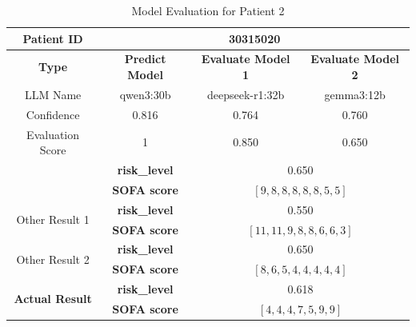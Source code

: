 \begin{table}[htbp]
 \centering
 \caption{Model Evaluation for Patient 2}
 \label{tab:patient2}
 \begin{tabular}{cccc}
 \toprule
 \textbf{ Patient ID } & \multicolumn{3}{c}{30315020} \\
 \midrule
 \textbf{ Type } & \textbf{ Predict Model } & \textbf{ Evaluate Model 1 } & \textbf{ Evaluate Model 2 } \\
 LLM Name & qwen3:30b & deepseek-r1:32b & gemma3:12b \\
 Confidence & 0.816 & 0.764 & 0.760 \\
 Evaluation Score & 1 & 0.850 & 0.650 \\
 \midrule
 \addlinespace
 \multirow{2}{*}{\textbf{ Best Result }} & \textbf{ risk\_level } & \multicolumn{2}{c}{0.650} \\
      & \textbf{ SOFA score } & \multicolumn{2}{c}{$[9, 8, 8, 8, 8, 8, 5, 5]$} \\
 \midrule
 \multirow{2}{*}{Other Result 1} & \textbf{ risk\_level } & \multicolumn{2}{c}{0.550} \\
      & \textbf{ SOFA score } & \multicolumn{2}{c}{$[11, 11, 9, 8, 8, 6, 6, 3]$} \\
 \midrule
 \multirow{2}{*}{Other Result 2} & \textbf{ risk\_level } & \multicolumn{2}{c}{0.650} \\
      & \textbf{ SOFA score } & \multicolumn{2}{c}{$[8, 6, 5, 4, 4, 4, 4, 4]$} \\
 \midrule
 \multirow{2}{*}{\textbf{ Actual Result }} & \textbf{ risk\_level } & \multicolumn{2}{c}{0.618} \\
      & \textbf{ SOFA score } & \multicolumn{2}{c}{$[4, 4, 4, 7, 5, 9, 9]$} \\
 \bottomrule
 \end{tabular}
\end{table}

